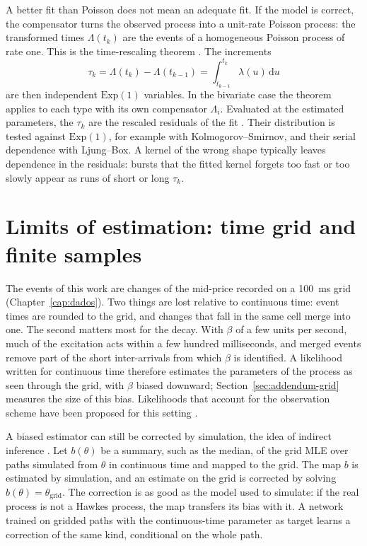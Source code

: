 \label{sec:time-rescaling}
A better fit than Poisson does not mean an adequate fit. If the model is correct, the compensator turns the observed process into a unit-rate
Poisson process: the transformed times \(\Lambda(t_k)\) are the events of a homogeneous
Poisson process of rate one. This is the time-rescaling theorem \citep{brown2002}. The
increments
\[
 \tau_k=\Lambda(t_k)-\Lambda(t_{k-1})=\int_{t_{k-1}}^{t_k}\lambda(u)\,\mathrm du
\]
are then independent \(\mathrm{Exp}(1)\) variables. In the bivariate case the theorem
applies to each type with its own compensator \(\Lambda_i\). Evaluated at the estimated
parameters, the \(\tau_k\) are the rescaled residuals of the fit \citep{ogata1988}. Their
distribution is tested against \(\mathrm{Exp}(1)\), for example with Kolmogorov--Smirnov,
and their serial dependence with Ljung--Box. A kernel of the wrong shape typically leaves
dependence in the residuals: bursts that the fitted kernel forgets too fast or too slowly
appear as runs of short or long \(\tau_k\).

\section{Limits of estimation: time grid and finite samples}

The events of this work are changes of the mid-price recorded on a 100~ms grid
(Chapter~\ref{cap:dados}). Two things are lost relative to continuous time: event times are
rounded to the grid, and changes that fall in the same cell merge into one. The second
matters most for the decay. With \(\beta\) of a few units per second, much of the excitation
acts within a few hundred milliseconds, and merged events remove part of the short
inter-arrivals from which \(\beta\) is identified. A likelihood written for continuous time
therefore estimates the parameters of the process as seen through the grid, with \(\beta\)
biased downward; Section~\ref{sec:addendum-grid} measures the size of this bias.
Likelihoods that account for the observation scheme have been proposed for this setting
\citep{lambe2025}.

A biased estimator can still be corrected by simulation, the idea of indirect inference
\citep{gourieroux1993}. Let \(b(\theta)\) be a summary, such as the median, of the grid MLE
over paths simulated from \(\theta\) in continuous time and mapped to the grid. The map
\(b\) is estimated by simulation, and an estimate on the grid is corrected by solving
\(b(\theta)=\hat\theta_{\mathrm{grid}}\). The correction is as good as the model used to
simulate: if the real process is not a Hawkes process, the map transfers its bias with it.
A network trained on gridded paths with the continuous-time parameter as target learns a
correction of the same kind, conditional on the whole path.

